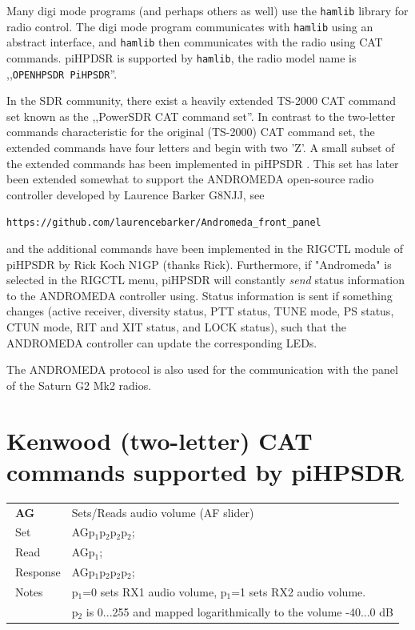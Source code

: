 \documentclass[12pt]{book}
\def\pH{pi\-HPSDR }
\begin{document}
Many digi mode programs (and perhaps others as well) use the \texttt{hamlib} library for radio control. The digi mode
program communicates with \texttt{hamlib} using an abstract interface, and \texttt{hamlib} then communicates with the radio
using CAT commands. piHPDSR is supported by \texttt{hamlib}, the radio model name is ,,\texttt{OPENHPSDR PiHPSDR}''.

In the SDR community, there exist a heavily extended TS-2000 CAT command set known as the ,,PowerSDR CAT
command set''. In contrast to the two-letter commands characteristic for the original (TS-2000) CAT
command set, the extended commands have four letters and begin with two 'Z'.
A small subset of the extended commands  has been implemented in \pH. This set has later been extended
somewhat to support the  ANDROMEDA open-source radio controller developed by Laurence Barker G8NJJ, see

\texttt{https://github.com/laurencebarker/Andromeda\_front\_panel}

and the additional commands have been implemented in
the RIGCTL module of \pH by Rick Koch N1GP (thanks Rick).
 Furthermore, if "Andromeda" is selected in the RIGCTL menu,
\pH will constantly
\textit{send} status information to the ANDROMEDA controller using. Status information is
sent if something
changes (active receiver,  diversity status, PTT status, TUNE mode, PS status, CTUN mode, RIT and XIT
status, and LOCK status),
such that the ANDROMEDA controller can update the corresponding LEDs.

The ANDROMEDA protocol is also used for the communication with the panel of the Saturn G2 Mk2 radios.


%
%



\section[Kenwood CAT commands]{Kenwood (two-letter) CAT commands supported by \pH}

\begin{center}
\begin{tabular}{|p{2cm}|p{11cm}|}
\toprule
$\phantom{\Big|}$\textbf{\large AG} & Sets/Reads audio volume (AF slider) \\\cline{1-2}
$\phantom{\Big|}${\large Set} & {AGp$_1$p$_2$p$_2$p$_2$;} \\\hline
$\phantom{\Big|}${\large Read} & {AGp$_1$;} \\\hline
$\phantom{\Big|}${\large Response} & {AGp$_1$p$_2$p$_2$p$_2$;} \\\hline
$\phantom{\Big|}${\large Notes} & \multicolumn{1}{|p{11cm}|}{p$_1$=0 sets RX1 audio volume, p$_1$=1 sets RX2 audio volume.} \\
 & \multicolumn{1}{|p{11cm}|}{p$_2$ is 0...255 and mapped logarithmically to the volume -40...0 dB} \\
\bottomrule
\end{tabular}
\end{center}
\end{document}
